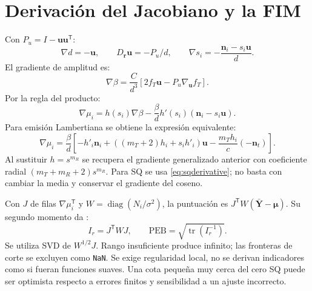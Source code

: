 \documentclass[11pt,a4paper]{article}
\begin{document}
\section{Derivación del Jacobiano y la FIM}
Con $P_u=I-\mathbf u\mathbf u^{\mathsf T}$:
\begin{equation}
 \nabla d=-\mathbf u,\qquad D_{\mathbf r}\mathbf u=-P_u/d,\qquad
 \nabla s_i=-\frac{\mathbf n_i-s_i\mathbf u}{d}.
\end{equation}
El gradiente de amplitud es:
\begin{equation}
 \nabla\beta=\frac{C}{d^3}\left[2f_T\mathbf u-P_u\nabla_{\mathbf u}f_T\right].
\end{equation}
Por la regla del producto:
\begin{equation}
 \boxed{\nabla\mu_i=h(s_i)\nabla\beta-
 \frac\beta d h'(s_i)(\mathbf n_i-s_i\mathbf u).}
\label{eq:gradient}
\end{equation}
Para emisión Lambertiana se obtiene la expresión equivalente:
\begin{equation}
 \nabla\mu_i=\frac\beta d\left[-h'_i\mathbf n_i+
 ((m_T+2)h_i+s_i h'_i)\mathbf u-\frac{m_T h_i}{c}(-\mathbf n_t)\right].
\end{equation}
Al sustituir $h=s^{m_R}$ se recupera el gradiente generalizado anterior con coeficiente radial $(m_T+m_R+2)s^{m_R}$. Para SQ se usa \eqref{eq:sqderivative}; no basta con cambiar la media y conservar el gradiente del coseno.

Con $J$ de filas $\nabla\mu_i^{\mathsf T}$ y $W=\operatorname{diag}(N_i/\sigma^2)$, la puntuación es $J^{\mathsf T}W(\bar{\mathbf Y}-\bm\mu)$. Su segundo momento da \cite{kay}:
\begin{equation}
 I_r=J^{\mathsf T}WJ,\qquad
 \mathrm{PEB}=\sqrt{\operatorname{tr}(I_r^{-1})}.
\end{equation}
Se utiliza SVD de $W^{1/2}J$. Rango insuficiente produce infinito; las fronteras de corte se excluyen como \texttt{NaN}. Se exige regularidad local, no se derivan indicadores como si fueran funciones suaves. Una cota pequeña muy cerca del cero SQ puede ser optimista respecto a errores finitos y sensibilidad a un ajuste incorrecto.
\end{document}
